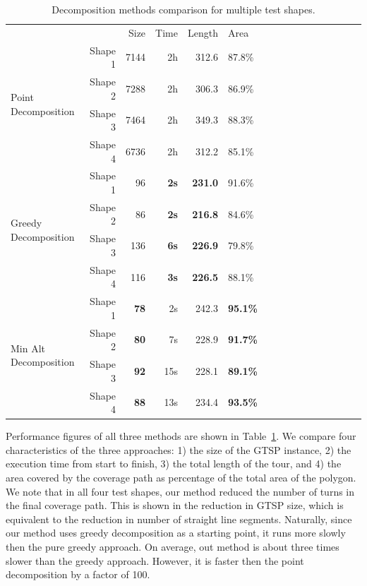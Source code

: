 \documentclass[../main.tex]{subfiles}
\begin{document}
\begin{table}
	\centering
	\begin{tabular}{@{} l rrrr l rrrr l rrrr l@{}}
		\toprule
		&& Size & Time & Length & Area \\
		\cmidrule{3-6}
		\multirow{4}{*}{Point Decomposition} & Shape 1 & 7144 & 2h & 312.6 & 87.8\%\\
		& Shape 2 & 7288  & 2h & 306.3 & 86.9\%\\
		& Shape 3 & 7464 & 2h & 349.3 & 88.3\%\\
		& Shape 4 & 6736 & 2h & 312.2 & 85.1\%\\
		\midrule
		\multirow{4}{*}{Greedy Decomposition} & Shape 1 & 96 & \bf{2s} & \bf{231.0} & 91.6\%\\
		& Shape 2 & 86 & \bf{2s} & \bf{216.8} & 84.6\%\\
		& Shape 3 & 136 & \bf{6s} & \bf{226.9} & 79.8\%\\
		& Shape 4 & 116 & \bf{3s} & \bf{226.5} & 88.1\%\\
		\midrule
		\multirow{4}{*}{Min Alt Decomposition} & Shape 1 & \bf{78} & 2s & 242.3 & \bf{95.1\%}\\
		& Shape 2 & \bf{80} & 7s & 228.9 & \bf{91.7\%} \\
		& Shape 3 & \bf{92} & 15s & 228.1 & \bf{89.1\%} \\
		& Shape 4 & \bf{88} & 13s & 234.4 & \bf{93.5\%}\\
		\bottomrule

	\end{tabular}
	\caption{Decomposition methods comparison for multiple test shapes.}
	\label{table:performance}
\end{table}


Performance figures of all three methods are shown in Table~\ref{table:performance}. We compare four characteristics of the three approaches: 1) the size of the GTSP instance, 2) the execution time from start to finish, 3) the total length of the tour, and 4) the area covered by the coverage path as percentage of the total area of the polygon. We note that in all four test shapes, our method reduced the number of turns in the final coverage path. This is shown in the reduction in GTSP size, which is equivalent to the reduction in number of straight line segments. Naturally, since our method uses greedy decomposition as a starting point, it runs more slowly then the pure greedy approach. On average, out method is about three times slower than the greedy approach. However, it is faster then the point decomposition by a factor of 100. 
\end{document}
